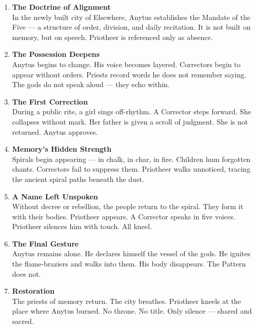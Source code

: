 \documentclass[9pt]{article}
\begin{document}
\begin{center}
\begin{enumerate}
    \item \textbf{The Doctrine of Alignment} \\
    In the newly built city of Elsewhere, Anytus establishes the Mandate of the Five — a structure of order, division, and daily recitation. It is not built on memory, but on speech. Priotheer is referenced only as absence.

    \vspace{.3in}
    \item \textbf{The Possession Deepens} \\
    Anytus begins to change. His voice becomes layered. Correctors begin to appear without orders. Priests record words he does not remember saying. The gods do not speak aloud — they echo within.

    \vspace{.3in}
    \item \textbf{The First Correction} \\
    During a public rite, a girl sings off-rhythm. A Corrector steps forward. She collapses without mark. Her father is given a scroll of judgment. She is not returned. Anytus approves.

    \vspace{.3in}
    \item \textbf{Memory's Hidden Strength} \\
    Spirals begin appearing — in chalk, in char, in fire. Children hum forgotten chants. Correctors fail to suppress them. Priotheer walks unnoticed, tracing the ancient spiral paths beneath the dust.

    \vspace{.3in}
    \item \textbf{A Name Left Unspoken} \\
    Without decree or rebellion, the people return to the spiral. They form it with their bodies. Priotheer appears. A Corrector speaks in five voices. Priotheer silences him with touch. All kneel.

    \vspace{.3in}
    \item \textbf{The Final Gesture} \\
    Anytus remains alone. He declares himself the vessel of the gods. He ignites the flame-braziers and walks into them. His body disappears. The Pattern does not.

    \vspace{.3in}
    \item \textbf{Restoration} \\
    The priests of memory return. The city breathes. Priotheer kneels at the place where Anytus burned. No throne. No title. Only silence — shared and sacred.


\end{enumerate}
\end{center}
\end{document}
